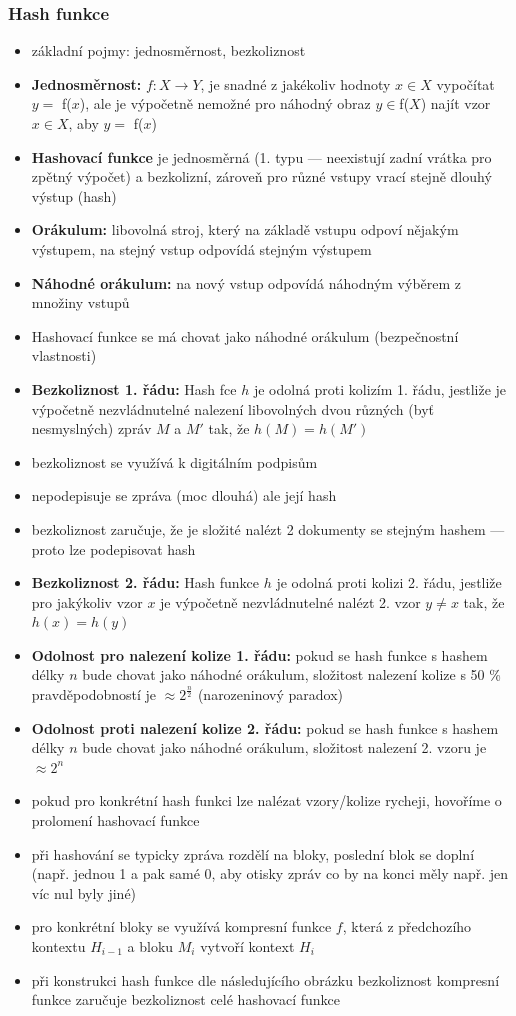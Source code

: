 \subsubsection*{Hash funkce}
\begin{itemize}
	\item základní pojmy: jednosměrnost, bezkoliznost
	\item \textbf{Jednosměrnost:} $f: X \rightarrow Y$, je snadné z jakékoliv hodnoty $x \in X$ vypočítat $y = $ f($x$), ale je výpočetně nemožné pro náhodný obraz $y \in $f($X$) najít vzor $x \in X$, aby $y = $ f($x$)
	\item \textbf{Hashovací funkce} je jednosměrná (1. typu --- neexistují zadní vrátka pro zpětný výpočet) a bezkolizní, zároveň pro různé vstupy vrací stejně dlouhý výstup (hash)
	\item \textbf{Orákulum:} libovolná stroj, který na základě vstupu odpoví nějakým výstupem, na stejný vstup odpovídá stejným výstupem
	\item \textbf{Náhodné orákulum:} na nový vstup odpovídá náhodným výběrem z množiny vstupů
	\item Hashovací funkce se má chovat jako náhodné orákulum (bezpečnostní vlastnosti)
	\item \textbf{Bezkoliznost 1. řádu:} Hash fce $h$ je odolná proti kolizím 1. řádu, jestliže je výpočetně nezvládnutelné nalezení libovolných dvou různých (byť nesmyslných) zpráv $M$ a $M'$ tak, že $h(M) = h(M')$
	\item bezkoliznost se využívá k digitálním podpisům
	\item nepodepisuje se zpráva (moc dlouhá) ale její hash
	\item bezkoliznost zaručuje, že je složité nalézt 2 dokumenty se stejným hashem --- proto lze podepisovat hash
	\item \textbf{Bezkoliznost 2. řádu:} Hash funkce $h$ je odolná proti kolizi 2. řádu, jestliže pro jakýkoliv vzor $x$ je výpočetně nezvládnutelné nalézt 2. vzor $y \neq x$ tak, že  $h(x) = h(y)$
	\item \textbf{Odolnost pro nalezení kolize 1. řádu:} pokud se hash funkce s hashem délky $n$ bude chovat jako náhodné orákulum, složitost nalezení kolize s 50 \% pravděpodobností je $\approx 2^{\frac{n}{2}}$ (narozeninový paradox)
	\item \textbf{Odolnost proti nalezení kolize 2. řádu:} pokud se hash funkce s hashem délky $n$ bude chovat jako náhodné orákulum, složitost nalezení 2. vzoru je $\approx 2^{n}$
	\item pokud pro konkrétní hash funkci lze nalézat vzory/kolize rycheji, hovoříme o prolomení hashovací funkce
	\item při hashování se typicky zpráva rozdělí na bloky, poslední blok se doplní (např. jednou 1 a pak samé 0, aby otisky zpráv co by na konci měly např. jen víc nul byly jiné)
	\item pro konkrétní bloky se využívá kompresní funkce $f$, která z předchozího kontextu $H_{i-1}$ a bloku $M_i$ vytvoří kontext $H_i$
	\item při konstrukci hash funkce dle následujícího obrázku bezkoliznost kompresní funkce zaručuje bezkoliznost celé hashovací funkce
\end{itemize}

